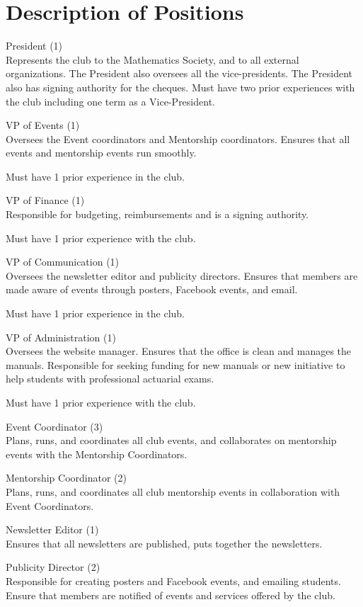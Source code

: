 \documentclass[11pt]{mathsoc}
\begin{document}
\section{Description of Positions}
President (1)\\
Represents the club to the Mathematics Society, and to all external 
organizations. The President also oversees all the vice-presidents. 
The President also has signing authority for the cheques. Must have 
two prior experiences with the club including one term as a Vice-President.

VP of Events (1)\\
Oversees the Event coordinators and Mentorship coordinators. Ensures 
that all events and mentorship events run smoothly. 

Must have 1 prior experience in the club.

VP of Finance (1)\\
Responsible for budgeting, reimbursements and is a signing authority. 

Must have 1 prior experience with the club.

VP of Communication (1)\\
Oversees the newsletter editor and publicity directors. Ensures that 
members are made aware of events through posters, Facebook events, and email. 

Must have 1 prior experience in the club.

VP of Administration (1)\\
Oversees the website manager. Ensures that the office is clean and manages the 
manuals. Responsible for seeking funding for new manuals or new initiative to 
help students with professional actuarial exams. 

Must have 1 prior experience with the club.

Event Coordinator (3)\\
Plans, runs, and coordinates all club events, and collaborates on mentorship 
events with the Mentorship Coordinators.

Mentorship Coordinator (2)\\
Plans, runs, and coordinates all club mentorship events in collaboration with 
Event Coordinators.

Newsletter Editor (1)\\
Ensures that all newsletters are published, puts together the newsletters.

Publicity Director (2)\\
Responsible for creating posters and Facebook events, and emailing students. 
Ensure that members are notified of events and services offered by the club.
\end{document}
